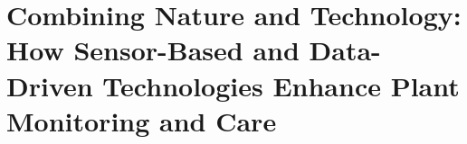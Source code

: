 \chapter[Combining Nature and Technology]{Combining Nature and Technology: How Sensor-Based and Data-Driven Technologies Enhance Plant Monitoring and Care}













